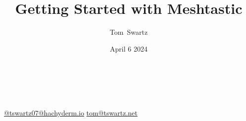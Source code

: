 \documentclass[aspectratio=169]{beamer}
\title{Getting Started with Meshtastic}
\author[Swartz]{Tom~Swartz}
\institute{Central PA Open Source Conference}
\date{April 6 2024}
\begin{document}

{
\begin{frame}[plain]
    \begin{TitleBox}
        \begin{center}
            {\color{red}\Large\inserttitle\color{black}}\\
        \end{center}
        \insertauthor{}\hfill\textbf{\insertinstitute{}}\hfill\insertdate{}\\
        {\footnotesize
        \href{https://hachyderm.io/@tswartz07}{@tswartz07@hachyderm.io}
        \hfill
        \href{mailto: tom@tswartz.net}{tom@tswartz.net}
        }
    \end{TitleBox}
    \vspace{15em}
\end{frame}}
\end{document}
